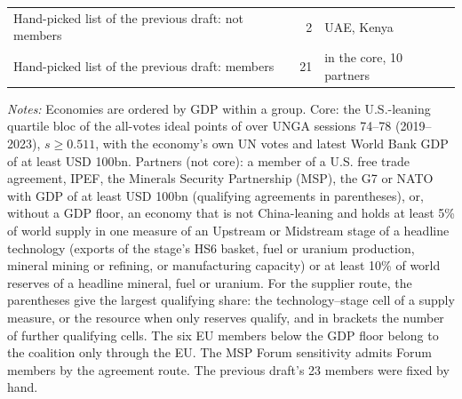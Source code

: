 \begin{table}[htbp]
\begin{threeparttable}
\begin{tabularx}{\textwidth}{@{}>{\raggedright\arraybackslash}p{} r >{\raggedright\arraybackslash}X@{}}
Hand-picked list of the previous draft: not members & 2 & UAE, Kenya \\
Hand-picked list of the previous draft: members & 21 & 11 in the core, 10 partners \\
\bottomrule
\end{tabularx}
\begin{tablenotes}[flushleft]\footnotesize
\item \emph{Notes:} Economies are ordered by GDP within a group. Core: the U.S.-leaning quartile bloc of the all-votes ideal points of \citet{bailey2017estimating} over UNGA sessions 74--78 (2019--2023), $s\geq 0.511$, with the economy's own UN votes and latest World Bank GDP of at least USD 100bn. Partners (not core): a member of a U.S. free trade agreement, IPEF, the Minerals Security Partnership (MSP), the G7 or NATO with GDP of at least USD 100bn (qualifying agreements in parentheses), or, without a GDP floor, an economy that is not China-leaning and holds at least 5\% of world supply in one measure of an Upstream or Midstream stage of a headline technology (exports of the stage's HS6 basket, fuel or uranium production, mineral mining or refining, or manufacturing capacity) or at least 10\% of world reserves of a headline mineral, fuel or uranium. For the supplier route, the parentheses give the largest qualifying share: the technology--stage cell of a supply measure, or the resource when only reserves qualify, and in brackets the number of further qualifying cells. The six EU members below the GDP floor belong to the coalition only through the EU. The MSP Forum sensitivity admits Forum members by the agreement route. The previous draft's 23 members were fixed by hand.
\end{tablenotes}
\end{threeparttable}
\end{table}
